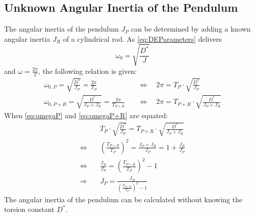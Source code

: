     \subsection{Unknown Angular Inertia of the Pendulum}\label{sec:preparation_task_3}
        The angular inertia of the pendulum \( J_P \) can be determined by adding a known angular inertia \( J_R \) of a cylindrical rod. As \cref{eq:DEParameters} delivers
        \begin{equation}
            \omega_0=\sqrt{\frac{D^*}{J}}
        \end{equation}
        and \( \omega=\frac{2\pi}{T} \), the following relation is given:
        \begin{align}
            \omega_{0,P}=\sqrt{\frac{D^*}{J_P}}=\frac{2\pi}{T_P} \quad              &\Leftrightarrow \quad 2\pi=T_P\cdot\sqrt{\frac{D^*}{J_P}} \label{eq:omegaP} \\
            \omega_{0,P+R}=\sqrt{\frac{D^*}{J_P+J_R}}=\frac{2\pi}{T_{P+R}} \quad    &\Leftrightarrow \quad 2\pi=T_{P+R}\cdot\sqrt{\frac{D^*}{J_P+J_R}} \label{eq:omegaP+R}
        \end{align}
        When \cref{eq:omegaP} and \cref{eq:omegaP+R} are equated:
        \begin{align}
                                    &T_P\cdot\sqrt{\frac{D^*}{J_P}}=T_{P+R}\cdot\sqrt{\frac{D^*}{J_P+J_R}} \nonumber\\
            \Leftrightarrow \quad   &\left( \frac{T_{P+R}}{T_P} \right)^2 =\frac{J_P+J_R}{J_P}=1+\frac{J_R}{J_P} \nonumber\\
            \Leftrightarrow \quad   &\frac{J_R}{J_P}=\left( \frac{T_{P+R}}{T_P} \right)^2-1 \nonumber\\
            \Rightarrow \quad       &J_P=\frac{J_R}{\left( \frac{T_{P+R}}{T_P} \right)^2-1}
            \label{eq:inertia}
        \end{align}
        The angular inertia of the pendulum can be calculated without knowing the torsion constant \( D^* \).
